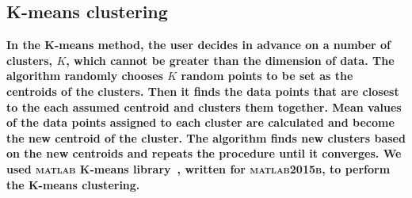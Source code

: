      
\subsection{K-means clustering}
\label{sec: kmeans_method}     
\textbf{In the K-means method, the user decides in advance on a number of clusters, $K$, which cannot be greater than the dimension of data. 
The algorithm randomly chooses $K$ random points to be set as the centroids of the clusters.
Then it finds the data points that are closest to the each assumed centroid and clusters them together.
Mean values of the data points assigned to each cluster are calculated and become the new centroid of the cluster. 
The algorithm finds new clusters based on the new centroids and repeats the procedure until it converges.
We used \textsc{matlab} K-means library~\citep{Seber84, Spath85}, written for \textsc{matlab2015b}, to perform the K-means clustering.}